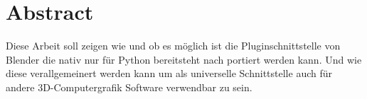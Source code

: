 \section*{Abstract}

Diese Arbeit soll zeigen wie und ob es möglich ist die Pluginschnittstelle von Blender die nativ nur für Python bereitsteht nach \cs portiert werden kann. Und wie diese verallgemeinert werden kann um als universelle Schnittstelle auch für andere 3D-Computergrafik Software verwendbar zu sein. 
